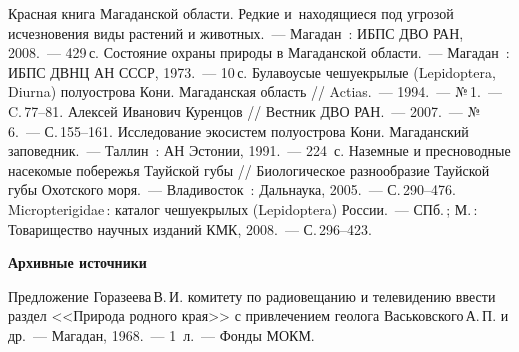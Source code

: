 \begin{thebibliography}{99}

\bibitem{} Красная книга Магаданской области. Редкие и~находящиеся под угрозой исчезновения виды растений и животных.~--- Магадан~: ИБПС ДВО РАН, 2008.~--- 429\,с.
\bibitem{} Состояние охраны природы в Магаданской области.~--- Магадан~: ИБПС ДВНЦ АН СССР, 1973.~--- 10\,с.
\bibitem{} Булавоусые чешуекрылые (Lepidoptera, Diurna) полуострова Кони. Магаданская область // Actias.~--- 1994.~--- №\,1.~--- C.\,77--81.
\bibitem{} Алексей Иванович Куренцов // Вестник ДВО РАН.~--- 2007.~--- №\,6.~--- С.\,155--161.
\bibitem{} Исследование экосистем полуострова Кони. Магаданский заповедник.~--- Таллин~: АН Эстонии, 1991.~--- 224~с.
\bibitem{} Наземные и пресноводные насекомые побережья Тауйской губы // Биологическое разнообразие Тауйской губы Охотского моря.~--- Владивосток~: Дальнаука, 2005.~--- С.\,290--476.
\bibitem{} Micropterigidae\,: каталог чешуекрылых (Lepidoptera) России.~--- СПб.\,; М.\,: Товарищество научных изданий КМК, 2008.~--- С.\,296--423.

\textbf{Архивные источники}

\bibitem{}Предложение Горазеева\,В.\,И. комитету по радиовещанию и телевидению ввести раздел <<Природа родного края>> с привлечением геолога Васьковского\,А.\,П. и др.~--- Магадан, 1968.~--- 1~л.~--- Фонды МОКМ.
\end{thebibliography}
